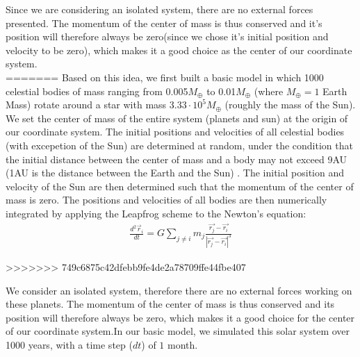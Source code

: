 Since we are considering an isolated system, there are no external forces presented. The momentum of the center of mass is thus conserved and it's position will therefore always be zero(since we chose it's initial position and velocity to be zero), which makes it a good choice as the center of our coordinate system.\\
=======
Based on this idea, we first built a basic model in which 1000 celestial bodies of mass ranging from 0.005$M_{\oplus}$ to 0.01$M_{\oplus}$ (where $M_{\oplus}=1$ Earth Mass)  rotate around a star with mass $3.33\cdot 10^5 M_{\oplus}$ (roughly the mass of the Sun).
We set the center of mass of the entire system (planets and sun) at the origin of our coordinate system. The initial positions and velocities of all celestial bodies (with excepetion of the Sun) are determined at random, under the condition that the initial distance between the center of mass and a body may not exceed 9AU (1AU is the distance between the Earth and the Sun) . The initial position and velocity of the Sun are then determined such that the momentum of the center of mass is zero. The positions and velocities of all bodies are then numerically integrated by applying the Leapfrog scheme to the Newton's equation:
\begin{align}
\frac{d^2\vec{r}_i}{dt}=G\sum_{j\neq i}m_j\frac{\vec{r_j}-\vec{r_i}}{|\vec{r_j}-\vec{r_i}|^3}
\end{align}


>>>>>>> 749c6875c42dfebb9fe4de2a78709ffe44fbe407

We consider an isolated system, therefore there are no external forces working on these planets. The momentum of the center of mass is thus conserved and its position will therefore always be zero, which makes it a good choice for the center of our coordinate system.In our basic model, we simulated this solar system over 1000 years, with a time step (\(dt\)) of $1$ month.\\


